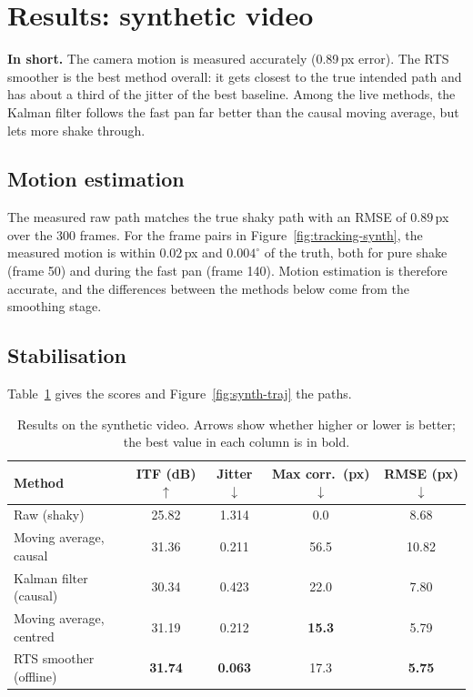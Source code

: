\documentclass[11pt,a4paper]{article}
\begin{document}
\section{Results: synthetic video}\label{sec:res-synth}

\begin{keybox}
\textbf{In short.} The camera motion is measured accurately (0.89\,px error). The RTS smoother
is the best method overall: it gets closest to the true intended path and has about a third of
the jitter of the best baseline. Among the live methods, the Kalman filter follows the fast pan
far better than the causal moving average, but lets more shake through.
\end{keybox}

\subsection{Motion estimation}
The measured raw path matches the true shaky path with an RMSE of $0.89$\,px over the 300
frames. For the frame pairs in Figure~\ref{fig:tracking-synth}, the measured motion is within
$0.02$\,px and $0.004^\circ$ of the truth, both for pure shake (frame 50) and during the fast pan
(frame 140). Motion estimation is therefore accurate, and the differences between the methods
below come from the smoothing stage.

\subsection{Stabilisation}
Table~\ref{tab:synth} gives the scores and Figure~\ref{fig:synth-traj} the paths.

\begin{table}[htbp]
  \centering
  \caption{Results on the synthetic video. Arrows show whether higher or lower is better; the
  best value in each column is in bold.}
  \label{tab:synth}
  \begin{tabular}{lcccc}
    \toprule
    Method & ITF (dB) $\uparrow$ & Jitter $\downarrow$ & Max corr.\ (px) $\downarrow$ & RMSE (px) $\downarrow$ \\
    \midrule
    Raw (shaky)              & 25.82 & 1.314 & 0.0  & 8.68 \\
    Moving average, causal   & 31.36 & 0.211 & 56.5 & 10.82 \\
    Kalman filter (causal)   & 30.34 & 0.423 & 22.0 & 7.80 \\
    Moving average, centred  & 31.19 & 0.212 & \textbf{15.3} & 5.79 \\
    RTS smoother (offline)   & \textbf{31.74} & \textbf{0.063} & 17.3 & \textbf{5.75} \\
    \bottomrule
  \end{tabular}
\end{table}
\end{document}
